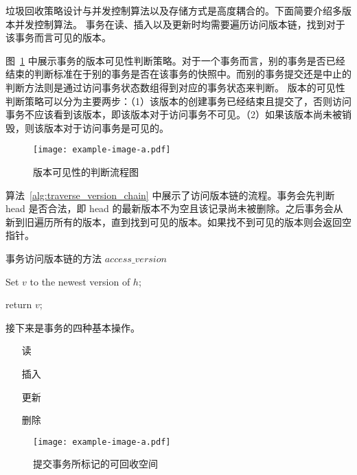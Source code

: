 垃圾回收策略设计与并发控制算法以及存储方式是高度耦合的。下面简要介绍多版本并发控制算法。
事务在读、插入以及更新时均需要遍历访问版本链，找到对于该事务而言可见的版本。

图~\ref{fig:version-visibility} 中展示事务的版本可见性判断策略。对于一个事务而言，别的事务是否已经结束的判断标准在于别的事务是否在该事务的快照中。而别的事务提交还是中止的判断方法则是通过访问事务状态数组得到对应的事务状态来判断。
版本的可见性判断策略可以分为主要两步：（1）该版本的创建事务已经结束且提交了，否则访问事务不应该看到该版本，即该版本对于访问事务不可见。（2）如果该版本尚未被销毁，则该版本对于访问事务是可见的。

\begin{figure}
    \centering
    \texttt{[image: example-image-a.pdf]}
    \caption{版本可见性的判断流程图}
    \label{fig:version-visibility}
\end{figure}

算法~\ref{alg:traverse_version_chain} 中展示了访问版本链的流程。事务会先判断 head 是否合法，即 head 的最新版本不为空且该记录尚未被删除。之后事务会从新到旧遍历所有的版本，直到找到可见的版本。如果找不到可见的版本则会返回空指针。


\begin{algorithm}[t]
    \caption{事务访问版本链的方法 $access\_version$}
    \label{alg:traverse_version_chain}
    \BlankLine

    Set $v$ to the newest version of $h$;


    return $v$;

\end{algorithm}

接下来是事务的四种基本操作。


\begin{itemize}
    \item[读]
    \item[插入]
    \item[更新]
    \item[删除]
\end{itemize}


\begin{figure}
    \centering
    \texttt{[image: example-image-a.pdf]}
    \caption{提交事务所标记的可回收空间}
    \label{fig:mvcc-read}
\end{figure}

